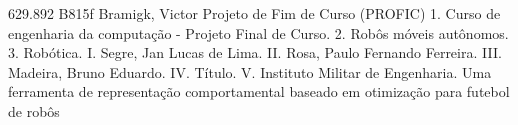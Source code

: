 \documentclass[
  12pt,				%
  oneside,			%
  a4paper,			%
  english,			%
  brazil,				%
  sumario=tradicional,
]{ime-abntex2}
\begin{document}


\imprimircapa
%

\imprimirfolhaderosto*
%


%
%     
\imprimirfichacatalografica
{629.892}
{B815f}
{Bramigk, Victor}
{Projeto de Fim de Curso (PROFIC)}
{%
  1. Curso de engenharia da computação - Projeto Final de Curso.
  2. Robôs móveis autônomos.
  3. Robótica.
  I. Segre, Jan Lucas de Lima.
  II. Rosa, Paulo Fernando Ferreira.
  III. Madeira, Bruno Eduardo.
  IV. Título.
  V. Instituto Militar de Engenharia.
}
{Uma ferramenta de representação comportamental baseado em otimização
para futebol de robôs}

%
%
%
%
\end{document}
